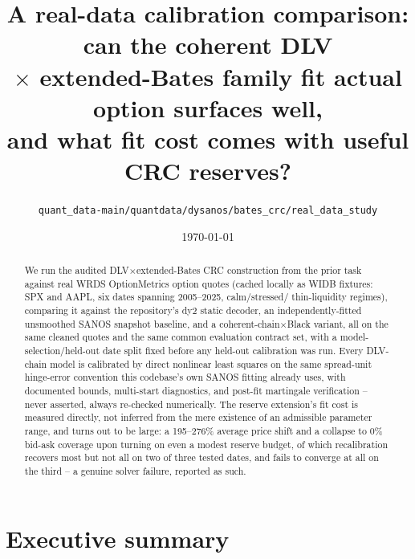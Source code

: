 \documentclass[11pt]{article}
\title{A real-data calibration comparison: can the coherent DLV\\
$\times$ extended-Bates family fit actual option surfaces well,\\
and what fit cost comes with useful CRC reserves?}
\author{\texttt{quant\_data-main/quantdata/dysanos/bates\_crc/real\_data\_study}}
\date{\today}
\begin{document}
\maketitle

\begin{abstract}
We run the audited DLV$\times$extended-Bates CRC construction from the
prior task against real WRDS OptionMetrics option quotes (cached locally as
WIDB fixtures: SPX and AAPL, six dates spanning 2005--2025, calm/stressed/
thin-liquidity regimes), comparing it against the repository's dy2 static
decoder, an independently-fitted unsmoothed SANOS snapshot baseline, and a
coherent-chain$\times$Black variant, all on the same cleaned quotes and the
same common evaluation contract set, with a model-selection/held-out date
split fixed before any held-out calibration was run. Every DLV-chain model
is calibrated by direct nonlinear least squares on the same spread-unit
hinge-error convention this codebase's own SANOS fitting already uses,
with documented bounds, multi-start diagnostics, and post-fit martingale
verification -- never asserted, always re-checked numerically. The reserve
extension's fit cost is measured directly, not inferred from the mere
existence of an admissible parameter range, and turns out to be large: a
195--276\% average price shift and a collapse to 0\% bid-ask coverage upon
turning on even a modest reserve budget, of which recalibration recovers
most but not all on two of three tested dates, and fails to converge at
all on the third -- a genuine solver failure, reported as such.
\end{abstract}

\tableofcontents

\section{Executive summary}
\label{sec:exec}
\end{document}

